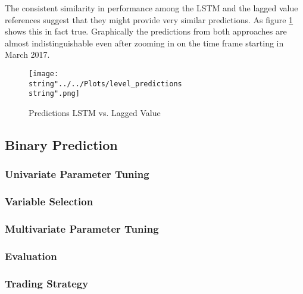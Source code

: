 The consistent similarity in performance among the LSTM and the lagged value references suggest that they might provide very similar  predictions. As figure \ref{fig:level_predictions} shows this in fact true. Graphically the predictions from both approaches are almost indistinguishable even after zooming in on the time frame starting in March 2017.

\begin{figure}[h!]
  \centering
\texttt{[image: \\string"../../Plots/level\_predictions\\string".png]}
  \caption{Predictions LSTM vs. Lagged Value }\label{fig:level_predictions}
\end{figure}

\FloatBarrier
\subsection{Binary Prediction}
\subsubsection{Univariate Parameter Tuning}

\subsubsection{Variable Selection}

\subsubsection{Multivariate Parameter Tuning}


\subsubsection{Evaluation}

\subsubsection{Trading Strategy}


\FloatBarrier

